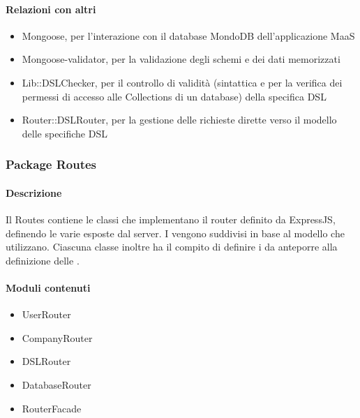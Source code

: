 \paragraph*{Relazioni con altri }
\begin{itemize}
\item Mongoose, per l'interazione con il database MondoDB dell'applicazione MaaS
\item Mongoose-validator, per la validazione degli schemi e dei dati memorizzati
\item Lib::DSLChecker, per il controllo di validità (sintattica e per la verifica dei permessi di accesso alle Collections di un database) della specifica DSL
\item Router::DSLRouter, per la gestione delle richieste dirette verso il modello delle specifiche DSL
\end{itemize}


\subsubsection{Package Routes}
\paragraph*{Descrizione}
Il  Routes contiene le classi che implementano il router definito da ExpressJS, definendo le varie  esposte dal server.
I  vengono suddivisi in base al modello che utilizzano. 
Ciascuna classe inoltre ha il compito di definire i  da anteporre alla definizione delle .\\

\paragraph*{Moduli contenuti}
\begin{itemize}
\item UserRouter
\item CompanyRouter
\item DSLRouter
\item DatabaseRouter
\item RouterFacade
\end{itemize}


